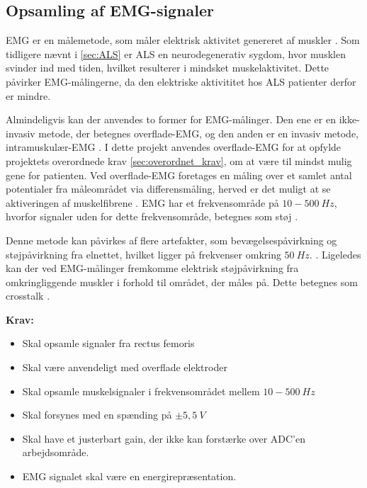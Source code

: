\subsection{Opsamling af EMG-signaler} \label{EMG_krav}
EMG er en målemetode, som måler elektrisk aktivitet genereret af muskler \citep{chowdhury2013}. 
Som tidligere nævnt i \autoref{sec:ALS} er ALS en neurodegenerativ sygdom, hvor musklen svinder ind med tiden, hvilket resulterer i mindsket muskelaktivitet. Dette påvirker EMG-målingerne, da den elektriske aktivititet hos ALS patienter derfor er mindre.

Almindeligvis kan der anvendes to former for EMG-målinger. Den ene er en ikke-invasiv metode, der betegnes overflade-EMG, og den anden er en invasiv metode, intramuskulær-EMG \citep{chowdhury2013, keenan2012}. I dette projekt anvendes overflade-EMG for at opfylde projektets overordnede krav \autoref{sec:overordnet_krav}, om at være til mindst mulig gene for patienten. Ved overflade-EMG foretages en måling over et samlet antal potentialer fra måleområdet via differensmåling, herved er det muligt at se aktiveringen af muskelfibrene \citep{keenan2012}. EMG har et frekvensområde på $10-500~Hz$, hvorfor signaler uden for dette frekvensområde, betegnes som støj \citep{morre2003, keenan2012}.  

Denne metode kan påvirkes af flere artefakter, som bevægelsespåvirkning og støjpåvirkning fra elnettet, hvilket ligger på frekvenser omkring $50~Hz$. \citep{keenan2012}.
Ligeledes kan der ved EMG-målinger fremkomme elektrisk støjpåvirkning fra omkringliggende muskler i forhold til området, der måles på. Dette betegnes som crosstalk \citep{keenan2012}. 
\vspace{3mm}

\textbf{Krav:}
\begin{itemize}
\item Skal opsamle signaler fra rectus femoris
\item Skal være anvendeligt med overflade elektroder
\item Skal opsamle muskelsignaler i frekvensområdet mellem $10-500~Hz$
\item Skal forsynes med en spænding på $\pm5,5~V$ 
\item Skal have et justerbart gain, der ikke kan forstærke over ADC'en arbejdsområde.
\item EMG signalet skal være en energirepræsentation.
\end{itemize}
